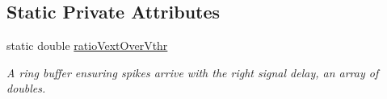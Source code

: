 \subsection*{Static Private Attributes}
\begin{DoxyCompactItemize}
\item 
\hypertarget{classNeuron_a1b5bf86e2ff7636a7e944909e19ec0f6}{static double \hyperlink{classNeuron_a1b5bf86e2ff7636a7e944909e19ec0f6}{ratio\-Vext\-Over\-Vthr}}\label{classNeuron_a1b5bf86e2ff7636a7e944909e19ec0f6}

\begin{DoxyCompactList}\small\item\em A ring buffer ensuring spikes arrive with the right signal delay, an array of doubles. \end{DoxyCompactList}\end{DoxyCompactItemize}


